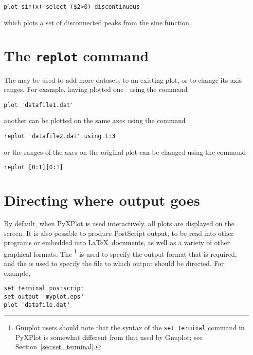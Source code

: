 \begin{verbatim}
plot sin(x) select ($2>0) discontinuous
\end{verbatim}

\noindent which plots a set of disconnected peaks from the sine function.

\section{The {\tt replot} command}
\label{sec:replot}

The  may be used to add more datasets to an existing plot, or
to change its axis ranges. For example, having plotted one \datafile\ using the
command

\begin{verbatim}
plot 'datafile1.dat'
\end{verbatim}

\noindent another can be plotted on the same axes using the command

\begin{verbatim}
replot 'datafile2.dat' using 1:3
\end{verbatim}

\noindent or the ranges of the axes on the original plot can be changed using
the command

\begin{verbatim}
replot [0:1][0:1]
\end{verbatim}

\section{Directing where output goes}
\label{sec:directing_output}

By default, when PyXPlot is used interactively, all plots are displayed on the
screen. It is also possible to produce PostScript output, to be read into other
programs or embedded into \LaTeX\ documents, as well as a variety of other
graphical formats. The \footnote{Gnuplot users should
note that the syntax of the {\tt set terminal} command in PyXPlot is somewhat
different from that used by Gnuplot; see Section~\ref{sec:set_terminal}.} is
used to specify the output format that is required, and the  is used to specify the file to which output should be directed. For
example,

\begin{verbatim}
set terminal postscript
set output 'myplot.eps'
plot 'datafile.dat'
\end{verbatim}

